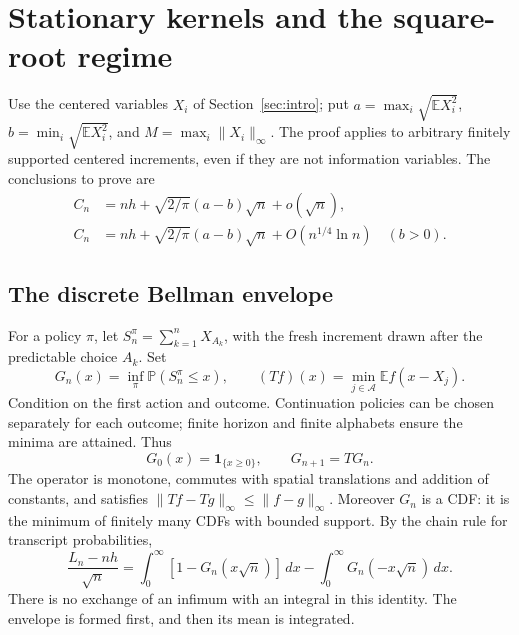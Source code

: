 \documentclass[11pt,a4paper]{article}
\theoremstyle{definition}\newtheorem{definition}[theorem]{Definition}
\theoremstyle{remark}\newtheorem{remark}[theorem]{Remark}
\newcommand{\E}{\mathbb E}
\newcommand{\Prb}{\mathbb P}
\numberwithin{equation}{section}
\begin{document}
\section{Stationary kernels and the square-root regime}\label{sec:sqrt}
Use the centered variables $X_i$ of Section~\ref{sec:intro}; put
$a=\max_i\sqrt{\E X_i^2}$, $b=\min_i\sqrt{\E X_i^2}$, and
$M=\max_i\|X_i\|_\infty$. The proof applies to arbitrary finitely supported
centered increments, even if they are not information variables.
The conclusions to prove are
\begin{align}
 C_n&=nh+\sqrt{2/\pi}(a-b)\sqrt n+o(\sqrt n),\label{sq:asymptotic}\\
 C_n&=nh+\sqrt{2/\pi}(a-b)\sqrt n+O(n^{1/4}\ln n)\quad(b>0).
 \label{sq:rate}
\end{align}
\subsection{The discrete Bellman envelope}
For a policy $\pi$, let $S_n^\pi=\sum_{k=1}^n X_{A_k}$, with the fresh
increment drawn after the predictable choice $A_k$. Set
\[
 G_n(x)=\inf_\pi\Prb(S_n^\pi\le x),\qquad
 (Tf)(x)=\min_{j\in\mathcal A}\E f(x-X_j).
\]
Condition on the first action and outcome. Continuation policies can be
chosen separately for each outcome; finite horizon and finite alphabets
ensure the minima are attained. Thus
\begin{equation}\label{sq:bellman}
 G_0(x)=\mathbf1_{\{x\ge0\}},\qquad G_{n+1}=TG_n.
\end{equation}
The operator is monotone, commutes with spatial translations and addition
of constants, and satisfies $\|Tf-Tg\|_\infty\le\|f-g\|_\infty$.
Moreover $G_n$ is a CDF: it is the minimum of finitely many CDFs with bounded
support. By the chain rule for transcript probabilities,
\begin{equation}\label{sq:meanidentity}
 \frac{L_n-nh}{\sqrt n}
 =\int_0^\infty[1-G_n(x\sqrt n)]\,dx
  -\int_0^\infty G_n(-x\sqrt n)\,dx.
\end{equation}
There is no exchange of an infimum with an integral in this identity.
The envelope is formed first, and then its mean is integrated.
\end{document}
